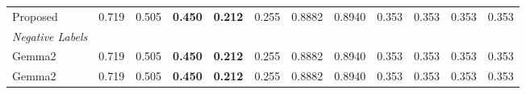 \begin{table}
{\begin{tabular}{l|cccccccccc||c}
            Proposed                           & 0.719                                                   & 0.505                                                   & \textbf{0.450}                                          & \textbf{0.212}                                                    & 0.255                                                    & 0.8882                                                    & 0.8940                                                            & 0.353                                                    & 0.353                                  & 0.353                                    & 0.353 \\
            \hdashline
            \textit{Negative Labels}           &                                                &                                                         &                                                         &                                                                   &                                                          &                                                           &                                                                   &                                                          &                                        &                                          &       \\
            Gemma2                             & 0.719                                                   & 0.505                                                   & \textbf{0.450}                                          & \textbf{0.212}                                                    & 0.255                                                    & 0.8882                                                    & 0.8940                                                            & 0.353                                                    & 0.353                                  & 0.353                                    & 0.353 \\
            Gemma2                             & 0.719                                                   & 0.505                                                   & \textbf{0.450}                                          & \textbf{0.212}                                                    & 0.255                                                    & 0.8882                                                    & 0.8940                                                            & 0.353                                                    & 0.353                                  & 0.353                                    & 0.353 \\

\end{tabular}}
\end{table}
